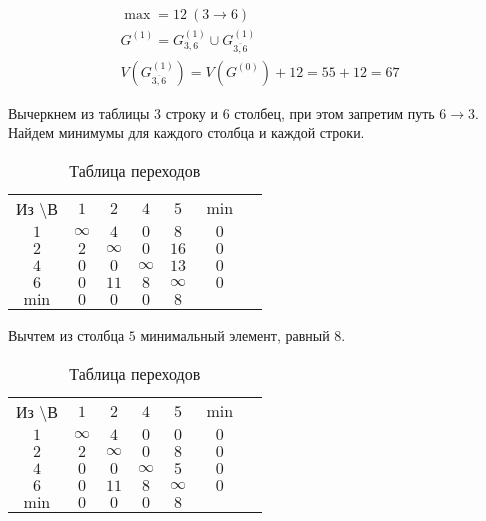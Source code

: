\vspace{-1cm}
\begin{gather*}
\max = 12\ (3 \rightarrow 6) \\
G^{(1)} = G_{3,6}^{(1)} \cup G_{\overline{3,6}}^{(1)} \\
V(G_{\overline{3,6}}^{(1)}) = V(G^{(0)}) + 12 = 55 + 12 = 67
\end{gather*}

Вычеркнем из таблицы $3$ строку и $6$ столбец, при этом запретим путь $6 \rightarrow 3$. Найдем минимумы для каждого столбца и каждой строки.

\begin{table}[H]
\begin{center}
	\def\tabcolsep{15pt}
	\caption{Таблица переходов}
	\label{tab:26}
	\begin{tabular}{|c||c|c|c|c|c|c|}
		\hline
		Из \textbackslash В & $1$ & $2$ & $4$ & $5$ & $\min$ \\
		\hhline{|=#=|=|=|=|=|}
		$1$ & $\infty$ & $4$ & $0$ & $8$ & $0$ \\
		\hline
		$2$ & $2$ & $\infty$ & $0$ & $16$ & $0$ \\
		\hline
		$4$ & $0$ & $0$ & $\infty$ & $13$ & $0$ \\
		\hline
		$6$ & $0$ & $11$ & $8$ & $\infty$ & $0$ \\
		\hhline{|=#=|=|=|=|=|}
		$\min$ & $0$ & $0$ & $0$ & $8$ & \\ 
		\hline
	\end{tabular}
\end{center}
\end{table}

Вычтем из столбца $5$ минимальный элемент, равный $8$.

\begin{table}[H]
\begin{center}
	\def\tabcolsep{15pt}
	\caption{Таблица переходов}
	\label{tab:27}
	\begin{tabular}{|c||c|c|c|c|c|c|}
		\hline
		Из \textbackslash В & $1$ & $2$ & $4$ & $5$ & $\min$ \\
		\hhline{|=#=|=|=|=|=|}
		$1$ & $\infty$ & $4$ & $0$ & $0$ & $0$ \\
		\hline
		$2$ & $2$ & $\infty$ & $0$ & $8$ & $0$ \\
		\hline
		$4$ & $0$ & $0$ & $\infty$ & $5$ & $0$ \\
		\hline
		$6$ & $0$ & $11$ & $8$ & $\infty$ & $0$ \\
		\hhline{|=#=|=|=|=|=|}
		$\min$ & $0$ & $0$ & $0$ & $8$ & \\ 
		\hline
	\end{tabular}
\end{center}
\end{table}


